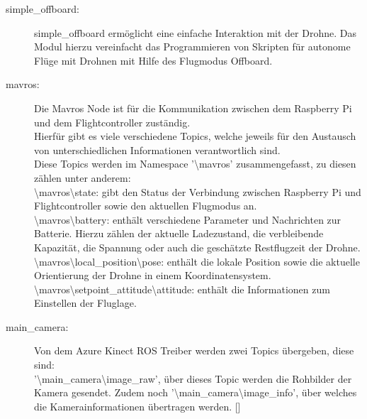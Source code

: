 \begin{description}
    \item[simple\_offboard:]{simple\_offboard ermöglicht eine einfache Interaktion mit der Drohne. Das Modul hierzu vereinfacht das Programmieren von Skripten für autonome Flüge mit Drohnen mit Hilfe des Flugmodus Offboard. \cite[vgl.][]{simple_offboard}}
    \item[mavros:]{Die Mavros Node ist für die Kommunikation zwischen dem Raspberry Pi und dem Flightcontroller zuständig.\\
    Hierfür gibt es viele verschiedene Topics, welche jeweils für den Austausch von unterschiedlichen Informationen verantwortlich sind.\\
    Diese Topics werden im Namespace '\textbackslash mavros' zusammengefasst, zu diesen zählen unter anderem:\\
    \textbackslash mavros\textbackslash state: gibt den Status der Verbindung zwischen Raspberry Pi und Flightcontroller sowie den aktuellen Flugmodus an.\\
    \textbackslash mavros\textbackslash battery: enthält verschiedene Parameter und Nachrichten zur Batterie. Hierzu zählen der aktuelle Ladezustand, die verbleibende Kapazität, die Spannung oder auch die geschätzte Restflugzeit der Drohne.\\
    \textbackslash mavros\textbackslash local\_position\textbackslash pose: enthält die lokale Position sowie die aktuelle Orientierung der Drohne in einem Koordinatensystem.\\
    \textbackslash mavros\textbackslash setpoint\_attitude\textbackslash attitude: enthält die Informationen zum Einstellen der Fluglage. \cite[vgl.][]{mavros}}
    \item[main\_camera:]{Von dem Azure Kinect ROS Treiber werden zwei Topics übergeben, diese sind: \\
    '\textbackslash main\_camera\textbackslash image\_raw', über dieses Topic werden die Rohbilder der Kamera gesendet. Zudem noch '\textbackslash main\_camera\textbackslash image\_info', über welches die Kamerainformationen übertragen werden. []}
\end{description}
 
